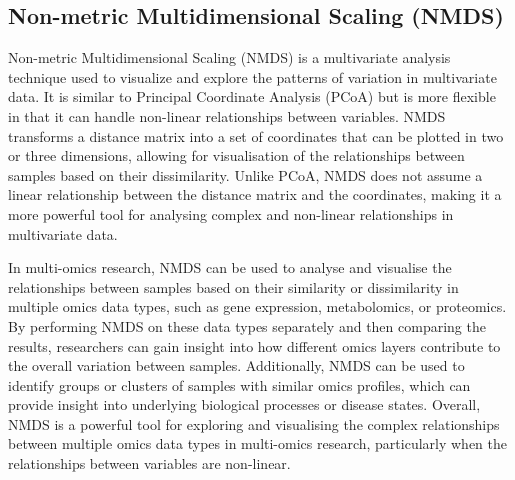 \documentclass[
]{book}
\newenvironment{Shaded}{\begin{snugshade}}{\end{snugshade}}
\newcommand{\AttributeTok}[1]{\textcolor[rgb]{0.77,0.63,0.00}{#1}}
\newcommand{\CommentTok}[1]{\textcolor[rgb]{0.56,0.35,0.01}{\textit{#1}}}
\newcommand{\DecValTok}[1]{\textcolor[rgb]{0.00,0.00,0.81}{#1}}
\newcommand{\FunctionTok}[1]{\textcolor[rgb]{0.00,0.00,0.00}{#1}}
\newcommand{\NormalTok}[1]{#1}
\newcommand{\OtherTok}[1]{\textcolor[rgb]{0.56,0.35,0.01}{#1}}
\newcommand{\SpecialCharTok}[1]{\textcolor[rgb]{0.00,0.00,0.00}{#1}}
\newcommand{\StringTok}[1]{\textcolor[rgb]{0.31,0.60,0.02}{#1}}
\begin{document}
\normalsize

\hypertarget{nmds}{%
\subsection{Non-metric Multidimensional Scaling (NMDS)}\label{nmds}}

Non-metric Multidimensional Scaling (NMDS) is a multivariate analysis technique used to visualize and explore the patterns of variation in multivariate data. It is similar to Principal Coordinate Analysis (PCoA) but is more flexible in that it can handle non-linear relationships between variables. NMDS transforms a distance matrix into a set of coordinates that can be plotted in two or three dimensions, allowing for visualisation of the relationships between samples based on their dissimilarity. Unlike PCoA, NMDS does not assume a linear relationship between the distance matrix and the coordinates, making it a more powerful tool for analysing complex and non-linear relationships in multivariate data.

In multi-omics research, NMDS can be used to analyse and visualise the relationships between samples based on their similarity or dissimilarity in multiple omics data types, such as gene expression, metabolomics, or proteomics. By performing NMDS on these data types separately and then comparing the results, researchers can gain insight into how different omics layers contribute to the overall variation between samples. Additionally, NMDS can be used to identify groups or clusters of samples with similar omics profiles, which can provide insight into underlying biological processes or disease states. Overall, NMDS is a powerful tool for exploring and visualising the complex relationships between multiple omics data types in multi-omics research, particularly when the relationships between variables are non-linear.

\small

\begin{Shaded}
\end{Shaded}
\end{document}
